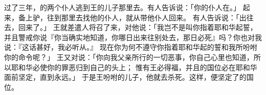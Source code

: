 {\par }{\PP {}过了三年，{}的两个仆人逃到{}王{}的儿子{}那里去。有人告诉{}说：「你的仆人在{}。」
起来，备上驴，往{}到{}那里去找他的仆人，就从{}带他仆人回来。
有人告诉{}说：「{}出{}往{}去，回来了。」
王就差遣人将{}召了来，对他说：「我岂不是叫你指着耶和华起誓，并且警戒你说『你当确实地知道，你哪日出来往别处去，那日必死』吗？你也对我说：『这话甚好，我必听从。』
现在你为何不遵守你指着耶和华起的誓和我所吩咐你的命令呢？」
王又对{}说：「你向我父亲{}所行的一切恶事，你自己心里也知道，所以耶和华必使你的罪恶归到自己的头上；
惟有{}王必得福，并且{}的国位必在耶和华面前坚定，直到永远。」
于是王吩咐{}的儿子{}，他就去杀死{}。这样，便坚定了{}的国位。

}
